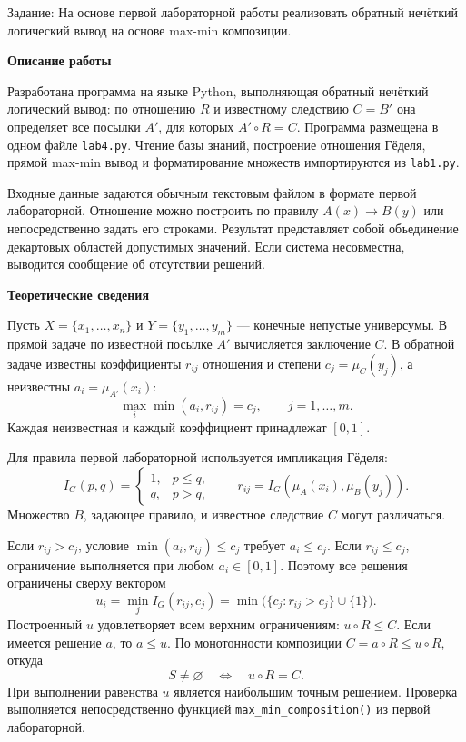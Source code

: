 \documentclass[14pt,a4paper]{extarticle}
\newcommand{\reportheading}[1]{\par\vspace{0.8\baselineskip}\noindent\textbf{#1}\par\nobreak\vspace{0.35\baselineskip}\nobreak}
\begin{document}
\noindent Задание: На основе первой лабораторной работы реализовать обратный нечёткий логический вывод на основе max-min композиции.


\reportheading{Описание работы}
Разработана программа на языке Python, выполняющая обратный нечёткий логический вывод: по отношению $R$ и известному следствию $C=B'$ она определяет все посылки $A'$, для которых $A'\circ R=C$. Программа размещена в одном файле \texttt{lab4.py}. Чтение базы знаний, построение отношения Гёделя, прямой max-min вывод и форматирование множеств импортируются из \texttt{lab1.py}.

Входные данные задаются обычным текстовым файлом в формате первой лабораторной. Отношение можно построить по правилу $A(x)\to B(y)$ или непосредственно задать его строками. Результат представляет собой объединение декартовых областей допустимых значений. Если система несовместна, выводится сообщение об отсутствии решений.

\reportheading{Теоретические сведения}
Пусть $X=\{x_1,\ldots,x_n\}$ и $Y=\{y_1,\ldots,y_m\}$ --- конечные непустые универсумы. В прямой задаче по известной посылке $A'$ вычисляется заключение $C$. В обратной задаче известны коэффициенты $r_{ij}$ отношения и степени $c_j=\mu_C(y_j)$, а неизвестны $a_i=\mu_{A'}(x_i)$:
\begin{equation}
 \max_i\min(a_i,r_{ij})=c_j,\qquad j=1,\ldots,m.
 \label{eq:system}
\end{equation}
Каждая неизвестная и каждый коэффициент принадлежат $[0,1]$.

Для правила первой лабораторной используется импликация Гёделя:
\begin{equation}
 I_G(p,q)=\begin{cases}1,&p\leq q,\\q,&p>q,\end{cases}
 \qquad r_{ij}=I_G(\mu_A(x_i),\mu_B(y_j)).
 \label{eq:godel}
\end{equation}
Множество $B$, задающее правило, и известное следствие $C$ могут различаться.

Если $r_{ij}>c_j$, условие $\min(a_i,r_{ij})\leq c_j$ требует $a_i\leq c_j$. Если $r_{ij}\leq c_j$, ограничение выполняется при любом $a_i\in[0,1]$. Поэтому все решения ограничены сверху вектором
\begin{equation}
 u_i=\min_j I_G(r_{ij},c_j)
 =\min\bigl(\{c_j:r_{ij}>c_j\}\cup\{1\}\bigr).
 \label{eq:upper}
\end{equation}
Построенный $u$ удовлетворяет всем верхним ограничениям: $u\circ R\leq C$. Если имеется решение $a$, то $a\leq u$. По монотонности композиции $C=a\circ R\leq u\circ R$, откуда
\begin{equation}
 S\ne\varnothing\quad\Longleftrightarrow\quad u\circ R=C.
 \label{eq:existence}
\end{equation}
При выполнении равенства $u$ является наибольшим точным решением. Проверка выполняется непосредственно функцией \texttt{max\_min\_composition()} из первой лабораторной.
\end{document}
